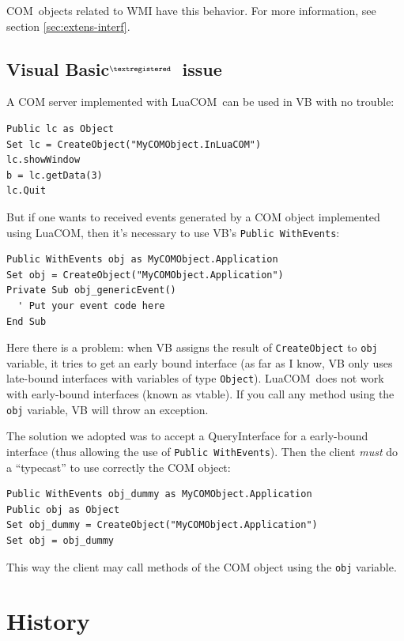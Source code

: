 \documentclass[11pt,a4paper,english]{report}
\newcommand{\techname}[1]{\mbox{#1}}
\newcommand{\com}{\techname{COM}}
\newcommand{\luacom}{\techname{LuaCOM}}
\newcommand{\registered}{$^{\textregistered}$}
\begin{document}
\com\ objects related to WMI have this behavior. For more information,
see section \ref{sec:extens-interf}.


\subsection{Visual Basic\registered\ issue}
\label{sec:visu-basicc-issue}
A COM server implemented with \luacom\ can be used in VB with no
trouble:

\begin{verbatim}
Public lc as Object
Set lc = CreateObject("MyCOMObject.InLuaCOM")
lc.showWindow
b = lc.getData(3)
lc.Quit
\end{verbatim}

But if one wants to received events generated by a COM object
implemented using \luacom, then it's necessary to use VB's
\verb+Public WithEvents+:

\begin{verbatim}
Public WithEvents obj as MyCOMObject.Application
Set obj = CreateObject("MyCOMObject.Application")
Private Sub obj_genericEvent()
  ' Put your event code here
End Sub
\end{verbatim}

Here there is a problem: when VB assigns the result of
\verb+CreateObject+ to \verb+obj+ variable, it tries to get an early
bound interface (as far as I know, VB only uses late-bound interfaces
with variables of type \verb+Object+). \luacom\ does not work with
early-bound interfaces (known as vtable). If you call any method using
the \verb+obj+ variable, VB will throw an exception.

The solution we adopted was to accept a QueryInterface for a
early-bound interface (thus allowing the use of \texttt{Public
WithEvents}). Then the client \emph{must} do a ``typecast'' to use
correctly the COM object:

\begin{verbatim}
Public WithEvents obj_dummy as MyCOMObject.Application
Public obj as Object
Set obj_dummy = CreateObject("MyCOMObject.Application")
Set obj = obj_dummy
\end{verbatim}

This way the client may call methods of the COM object using the
\texttt{obj} variable.






\section{History}
\end{document}
